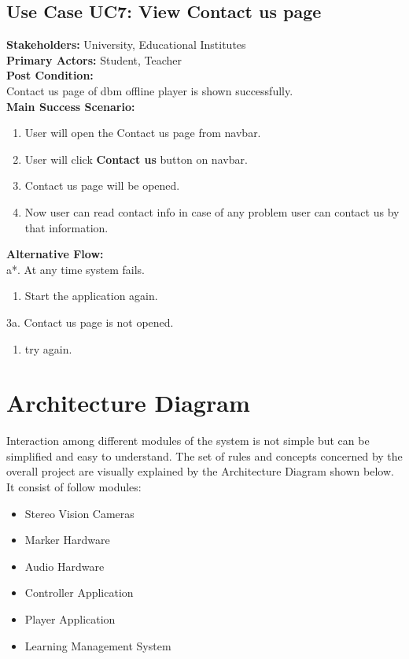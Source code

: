\subsection{Use Case UC7: View Contact us page}
\textbf{Stakeholders: } University, Educational Institutes \\
\textbf{Primary Actors: } Student, Teacher \\
\textbf{Post Condition: }\\
Contact us page of dbm offline player is shown successfully.\\
\textbf{Main Success Scenario: }
\begin{enumerate}
\item User will open the Contact us page from navbar.
\item User will click \textbf{Contact us} button on navbar.
\item Contact us page will be opened.
\item Now user can read contact info in case of any problem user can contact us by that information.

\end{enumerate}
\textbf{Alternative Flow: }\\
a*. At any time system fails.
\begin{enumerate}
\item Start the application again.
\end{enumerate}
3a. Contact us page is not opened.
\begin{enumerate}
\item try again.
\end{enumerate}



\section{Architecture Diagram}
Interaction among different modules of the system is not simple but can be simplified and easy to understand. The set of rules and concepts concerned by the overall project are visually explained by the Architecture Diagram shown below.
It consist of follow modules:
\begin{itemize}

\item Stereo Vision Cameras
\item Marker Hardware
\item Audio Hardware
\item Controller Application
\item Player Application
\item Learning Management System

\end{itemize}


